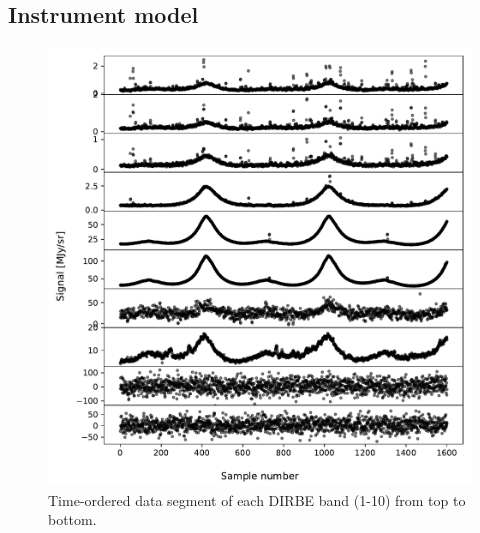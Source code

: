 \documentclass{aa}
\begin{document}
\subsection{Instrument model}



\begin{figure}
  \centering
   	\includegraphics[width=\linewidth]{figs/cios.pdf}
  	\caption{Time-ordered data segment of each DIRBE band (1-10) from top to bottom.}
	\label{fig: cios}
\end{figure}
\end{document}
